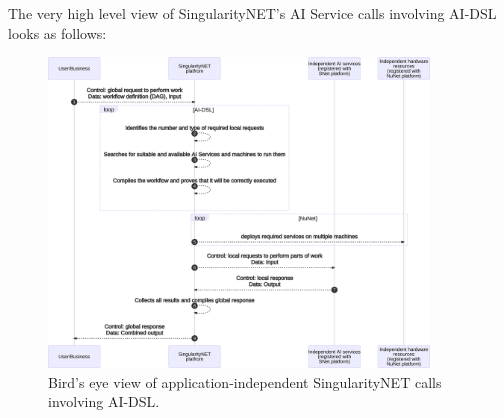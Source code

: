 \documentclass[]{report}
\begin{document}
The very high level view of SingularityNET's
AI Service calls involving AI-DSL looks as follows:

\begin{figure}[H]
	\centering
	\includegraphics[width=0.9\textwidth]{../../../ontology/images/high-level-workflow-construction.png}
	\captionsetup{width=0.9\linewidth}
	\caption{\label{fig:high-level-workflow-construction}Bird's eye view of 
		application-independent SingularityNET calls involving AI-DSL.}
\end{figure}
\end{document}
